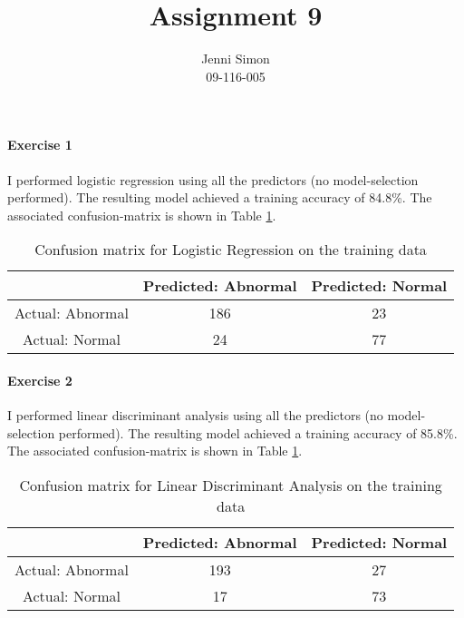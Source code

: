 \documentclass{paper}
\title{Assignment 9}
\author{Jenni Simon\\09-116-005}
\begin{document}
\maketitle


%


\paragraph{Exercise 1}

I performed logistic regression using all the predictors (no model-selection performed). The resulting model achieved a training accuracy of 84.8\%. The associated confusion-matrix is shown in Table \ref{tab:log}. 

\begin{table}[!h]
\centering
\caption{Confusion matrix for Logistic Regression on the training data}
\begin{tabular}{|c|c|c|}
\hline
 & Predicted: Abnormal & Predicted: Normal \\ \hline
Actual: Abnormal          & 186         &       23                              \\ 
Actual: Normal              & 24        &         77                            \\ \hline
\end{tabular}
\label{tab:log}
\end{table}


\paragraph{Exercise 2}

I performed linear discriminant analysis using all the predictors (no model-selection performed). The resulting model achieved a training accuracy of 85.8\%. The associated confusion-matrix is shown in Table \ref{tab:log}. 

\begin{table}[!h]
\centering
\caption{Confusion matrix for Linear Discriminant Analysis on the training data}
\begin{tabular}{|c|c|c|}
\hline
 & Predicted: Abnormal & Predicted: Normal \\ \hline
Actual: Abnormal          & 193        &     27                                \\ 
Actual: Normal              & 17         &       73                              \\ \hline
\end{tabular}
\label{tab:lda}
\end{table}
\end{document}
